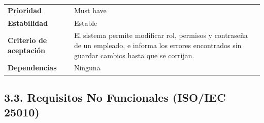 \documentclass[
]{article}
\begin{document}
{\begin{longtable}[]{|
  >{\raggedright\arraybackslash}p{}|
  >{\raggedright\arraybackslash}p{}|}
\begin{minipage}[t]{\linewidth}
\end{minipage} \\
\hline
\textbf{Prioridad} & \begin{minipage}[t]{\linewidth}\raggedright
Must have
\end{minipage} \\
\hline
\textbf{Estabilidad} & \begin{minipage}[t]{\linewidth}\raggedright
Estable
\end{minipage} \\
\hline
\textbf{Criterio de aceptación} &
\begin{minipage}[t]{\linewidth}\raggedright
El sistema permite modificar rol, permisos y contraseña de un empleado, e informa los errores encontrados sin guardar cambios hasta que se corrijan.
\end{minipage} \\
\hline
\textbf{Dependencias} & \begin{minipage}[t]{\linewidth}\raggedright
Ninguna
\end{minipage} \\
\hline
\end{longtable}
}

\subsection{3.3. Requisitos No Funcionales (ISO/IEC 25010)}\label{requisitos-no-funcionales-isoiec-25010}
\end{document}
